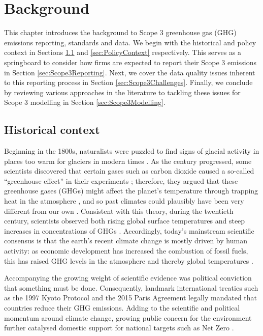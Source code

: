 \documentclass[12pt,twoside]{report}
\begin{document}
\chapter{Background}

This chapter introduces the background to Scope 3 greenhouse gas (GHG) emissions reporting, standards and data. We begin with the historical and policy context in Sections \ref{sec:HistoricalContext} and \ref{sec:PolicyContext} respectively. This serves as a springboard to consider how firms are expected to report their Scope 3 emissions in Section \ref{sec:Scope3Reporting}. Next, we cover the data quality issues inherent to this reporting process in Section \ref{sec:Scope3Challenges}. Finally, we conclude by reviewing various approaches in the literature to tackling these issues for Scope 3 modelling in Section \ref{sec:Scope3Modelling}. 

\section{Historical context}\label{sec:HistoricalContext}
Beginning in the 1800s, naturalists were puzzled to find signs of glacial activity in places too warm for glaciers in modern times \cite{young1995}. As the century progressed, some scientists discovered that certain gases such as carbon dioxide caused a so-called ``greenhouse effect'' in their experiments \cite{Ekholm1901}; therefore, they argued that these greenhouse gases (GHGs) might affect the planet's temperature through trapping heat in the atmosphere \cite{Arrhenius1896}, and so past climates could plausibly have been very different from our own \cite{foote1856}. Consistent with this theory, during the twentieth century, scientists observed both rising global surface temperatures and steep increases in concentrations of GHGs \cite{Sawyer1972}. Accordingly, today's mainstream scientific consensus is that the earth's recent climate change is mostly driven by human activity: as economic development has increased the combustion of fossil fuels, this has raised GHG levels in the atmosphere and thereby global temperatures \cite{IPCC2021, RS2020}. 

Accompanying the growing weight of scientific evidence was political conviction that something must be done. Consequently, landmark international treaties such as the 1997 Kyoto Protocol \cite{UN1997} and the 2015 Paris Agreement \cite{UNFCCC2020} legally mandated that countries reduce their GHG emissions. Adding to the scientific and political momentum around climate change, growing public concern for the environment further catalysed domestic support for national targets such as Net Zero \cite{Poortinga2023}. 
\end{document}
